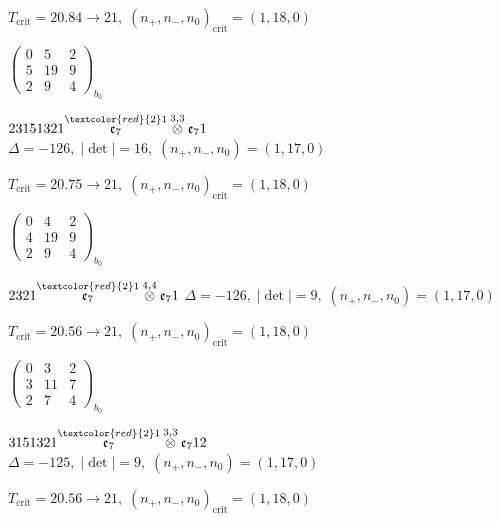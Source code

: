 \documentclass[10pt]{article}
\begin{document}
\hspace{1em}$T_{\text{crit}}=20.84 \to 21,\; (n_+,n_-,n_0)_{\text{crit}}=(1,18,0)$

\hspace{2em}$\left(\begin{smallmatrix}0 & 5 & 2 \\ 5 & 19 & 9 \\ 2 & 9 & 4\end{smallmatrix}\right)_{\!b_0}$

\smallskip

$23151321\overset{\textcolor{red}{2}1}{\mathfrak{e}_7}\overset{3,3}{\otimes}\mathfrak{e}_71$ \quad $\Delta=-126,\; |\det|=16,\; (n_+,n_-,n_0)=(1,17,0)$

\hspace{1em}$T_{\text{crit}}=20.75 \to 21,\; (n_+,n_-,n_0)_{\text{crit}}=(1,18,0)$

\hspace{2em}$\left(\begin{smallmatrix}0 & 4 & 2 \\ 4 & 19 & 9 \\ 2 & 9 & 4\end{smallmatrix}\right)_{\!b_0}$

\smallskip

$2321\overset{\textcolor{red}{2}1}{\mathfrak{e}_7}\overset{4,4}{\otimes}\mathfrak{e}_71$ \quad $\Delta=-126,\; |\det|=9,\; (n_+,n_-,n_0)=(1,17,0)$

\hspace{1em}$T_{\text{crit}}=20.56 \to 21,\; (n_+,n_-,n_0)_{\text{crit}}=(1,18,0)$

\hspace{2em}$\left(\begin{smallmatrix}0 & 3 & 2 \\ 3 & 11 & 7 \\ 2 & 7 & 4\end{smallmatrix}\right)_{\!b_0}$

\smallskip

$3151321\overset{\textcolor{red}{2}1}{\mathfrak{e}_7}\overset{3,3}{\otimes}\mathfrak{e}_712$ \quad $\Delta=-125,\; |\det|=9,\; (n_+,n_-,n_0)=(1,17,0)$

\hspace{1em}$T_{\text{crit}}=20.56 \to 21,\; (n_+,n_-,n_0)_{\text{crit}}=(1,18,0)$
\end{document}
